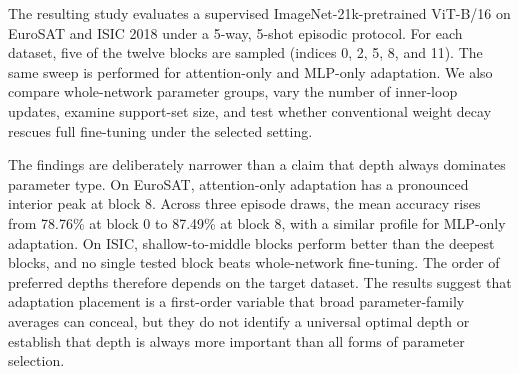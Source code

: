 \documentclass[11pt]{article}
\begin{document}
The resulting study evaluates a supervised ImageNet-21k-pretrained ViT-B/16 on EuroSAT and ISIC 2018 under a 5-way, 5-shot episodic protocol. For each dataset, five of the twelve blocks are sampled (indices 0, 2, 5, 8, and 11). The same sweep is performed for attention-only and MLP-only adaptation. We also compare whole-network parameter groups, vary the number of inner-loop updates, examine support-set size, and test whether conventional weight decay rescues full fine-tuning under the selected setting.

The findings are deliberately narrower than a claim that depth always dominates parameter type. On EuroSAT, attention-only adaptation has a pronounced interior peak at block 8. Across three episode draws, the mean accuracy rises from 78.76\% at block 0 to 87.49\% at block 8, with a similar profile for MLP-only adaptation. On ISIC, shallow-to-middle blocks perform better than the deepest blocks, and no single tested block beats whole-network fine-tuning. The order of preferred depths therefore depends on the target dataset. The results suggest that adaptation placement is a first-order variable that broad parameter-family averages can conceal, but they do not identify a universal optimal depth or establish that depth is always more important than all forms of parameter selection.
\end{document}
